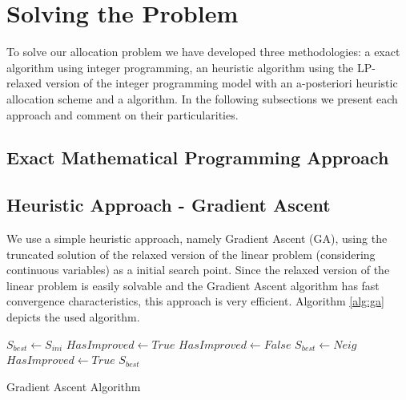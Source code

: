 \section{Solving the Problem}
\label{sec:alter}

To solve our allocation problem we have developed three methodologies: a exact algorithm
using integer programming, an heuristic algorithm using the LP-relaxed version of the integer
programming model with an a-posteriori heuristic allocation scheme and a 
algorithm. In the following subsections we present each approach and comment on their particularities.

\subsection{Exact Mathematical Programming Approach}

\subsection{Heuristic Approach - Gradient Ascent}
We use a simple heuristic approach, namely Gradient Ascent (GA), using
the truncated solution of the relaxed version of the linear problem (considering continuous
variables) as a initial search point.
Since the relaxed version of the linear problem is easily solvable and the Gradient Ascent
algorithm has fast convergence characteristics, this approach is very efficient. Algorithm \ref{alg:ga} depicts the used algorithm.

\begin{algorithm}[H]
\begin{algorithmic}[1]
\State $S_{best} \gets S_{ini}$
\State $HasImproved \gets True$
    \State $HasImproved \gets False$
            \State $S_{best} \gets Neig$
            \State $HasImproved \gets True$
        \EndIf
    \EndFor
\EndWhile
\State \Return $S_{best}$
\EndFunction
\end{algorithmic}
\caption{Gradient Ascent Algorithm}
\label{alg:ga}
\end{algorithm}

